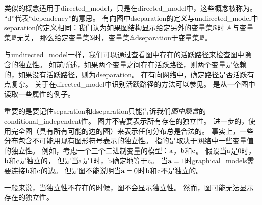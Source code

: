 类似的概念适用于\gls{directed_model}，只是在\gls{directed_model}中，这些概念被称为。
``d''代表``\gls{dependency}''的意思。
有向图中\gls{dseparation}的定义与\gls{undirected_model}中\gls{separation}的定义相同：我们认为如果图结构显示给定另外的变量集$\mathbb{S}$时 $\mathbb{A}$与变量集$\mathbb{B}$无关，
那么给定变量集$\mathbb{S}$时，变量集$\mathbb{A}$\gls{dseparation}于变量集$\mathbb{B}$。


与\gls{undirected_model}一样，我们可以通过查看图中存在的活跃路径来检查图中隐含的独立性。
如前所述，如果两个变量之间存在活跃路径，则两个变量是依赖的，如果没有活跃路径，则为\gls{dseparation}。
在有向网络中，确定路径是否活跃有点复杂。
关于在\gls{directed_model}中识别活跃路径的方法可以参见。 
是从一个图中读取一些属性的例子。





重要的是要记住\gls{separation}和\gls{dseparation}只能告诉我们\emph{图中隐含}的\gls{conditional_independent}性。
图并不需要表示所有存在的独立性。 
进一步的，使用完全图（具有所有可能的边的图）来表示任何分布总是合法的。
事实上，一些分布包含不可能用现有图形符号表示的独立性。
指的是取决于网络中一些变量值的独立性。
例如，考虑一个三个二进制变量的模型：$\mathrm{a}$，$\mathrm{b} $和$\mathrm{c}$。
假设当$\mathrm{a}$是0时，$\mathrm{b}$和$\mathrm{c}$是独立的， 但是当$\mathrm{a}$是1时，$\mathrm{b}$确定地等于$\mathrm{c}$。
当$\mathrm{a} = 1$时\gls{graphical_models}需要连接$\mathrm{b}$和$\mathrm{c}$的边。
但是图不能说明当$\mathrm{a} = 0$时$\mathrm{b}$和$\mathrm{c}$不是独立的。

一般来说，当独立性不存在的时候，图不会显示独立性。 
然而，图可能无法显示存在的独立性。



